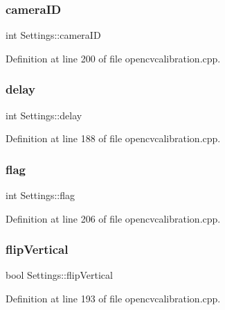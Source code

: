 \subsubsection{\texorpdfstring{cameraID}{cameraID}}
{\footnotesize\ttfamily int Settings\+::camera\+ID}



Definition at line 200 of file opencvcalibration.\+cpp.

\mbox{\label{class_settings_a5fe947366441009187d633f9e4663256}} 
\subsubsection{\texorpdfstring{delay}{delay}}
{\footnotesize\ttfamily int Settings\+::delay}



Definition at line 188 of file opencvcalibration.\+cpp.

\mbox{\label{class_settings_aba5691e3e76525f93ea254e654ec3717}} 
\subsubsection{\texorpdfstring{flag}{flag}}
{\footnotesize\ttfamily int Settings\+::flag}



Definition at line 206 of file opencvcalibration.\+cpp.

\mbox{\label{class_settings_ab6304f260b315d2820f755e1c3a052b5}} 
\subsubsection{\texorpdfstring{flipVertical}{flipVertical}}
{\footnotesize\ttfamily bool Settings\+::flip\+Vertical}



Definition at line 193 of file opencvcalibration.\+cpp.

\mbox{\label{class_settings_a3b9fc27b555f982bd5b9ea5198e1f7e3}} 
